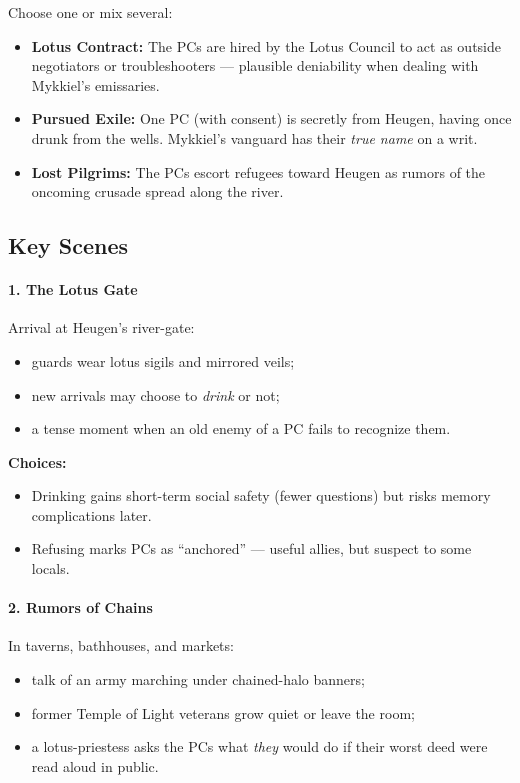 \documentclass[11pt]{article}
\begin{document}
Choose one or mix several:

\begin{itemize}[leftmargin=*]
  \item \textbf{Lotus Contract:} The PCs are hired by the Lotus Council to act as outside negotiators or troubleshooters --- plausible deniability when dealing with Mykkiel's emissaries.
  \item \textbf{Pursued Exile:} One PC (with consent) is secretly from Heugen, having once drunk from the wells. Mykkiel's vanguard has their \emph{true name} on a writ.
  \item \textbf{Lost Pilgrims:} The PCs escort refugees toward Heugen as rumors of the oncoming crusade spread along the river.
\end{itemize}

\subsection*{Key Scenes}

\paragraph{1. The Lotus Gate}

Arrival at Heugen's river-gate:
\begin{itemize}[leftmargin=*]
  \item guards wear lotus sigils and mirrored veils;
  \item new arrivals may choose to \emph{drink} or not;
  \item a tense moment when an old enemy of a PC fails to recognize them.
\end{itemize}

\textbf{Choices:}
\begin{itemize}[leftmargin=*]
  \item Drinking gains short-term social safety (fewer questions) but risks memory complications later.
  \item Refusing marks PCs as ``anchored'' --- useful allies, but suspect to some locals.
\end{itemize}

\paragraph{2. Rumors of Chains}

In taverns, bathhouses, and markets:
\begin{itemize}[leftmargin=*]
  \item talk of an army marching under chained-halo banners;
  \item former Temple of Light veterans grow quiet or leave the room;
  \item a lotus-priestess asks the PCs what \emph{they} would do if their worst deed were read aloud in public.
\end{itemize}
\end{document}
